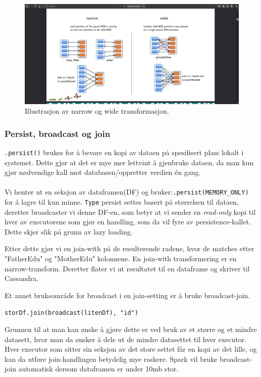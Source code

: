 \FigureCounter
\begin{figure}[H]
    \centering
    \includegraphics[scale=0.3]{images/milepael6/transformActionPic.png}
    Illustrasjon av narrow og wide transformasjon.
\end{figure}

\subsubsection{Persist, broadcast og join}
\lstinline{.persist()} brukes for å bevare en kopi av dataen på spesifisert plass lokalt i systemet. Dette gjør at det er mye mer lettvint å gjenbruke dataen, da man kun gjør nødvendige kall mot databasen/oppretter verdien én gang.


\paragraph{}
 Vi henter ut en seksjon av dataframen(DF)
 og bruker:\lstinline{.persist(MEMORY_ONLY)} for å lagre til kun minne.
 \lstinline{Type} persist settes basert på størrelsen til dataen,
  deretter broadcaster vi denne DF-en, som betyr at vi sender en 
  \textit{read-only} kopi til hver av executorene som gjør en handling, som da vil fyre av persistence-kallet. Dette skjer slik på grunn av lazy loading.

Etter dette gjør vi en join-with på de resulterende radene, hvor de matches etter "FatherEdu" og "MotherEdu" kolonnene. En join-with transformering er en narrow-transform. Deretter flater vi ut resultatet til en dataframe og skriver til Cassandra.

Et annet bruksområde for broadcast i en join-setting er å bruke broadcast-join.

\lstinline {storDf.join(broadcast(litenDf), "id")}

Grunnen til at man kan ønske å gjøre dette er ved bruk av et større og et mindre datasett, hvor man da ønsker å dele ut de mindre datasettet til hver executor. Hver executor som sitter sin seksjon av det store settet får en kopi av det lille, og kan da utføre join-handlingen betydelig mye raskere. Spark vil bruke broadcast-join automatisk dersom dataframen er under 10mb stor.


